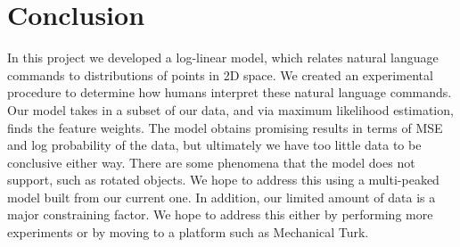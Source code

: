 \documentclass[12pt,letterpaper]{article}
\begin{document}
\section{Conclusion}
In this project we developed a log-linear model, which relates natural language commands to distributions of points in 2D space. We created an experimental procedure to determine how humans interpret these natural language commands. Our model takes in a subset of our data, and via maximum likelihood estimation, finds the feature weights. The model obtains promising results in terms of MSE and log probability of the data, but ultimately we have too little data to be conclusive either way. There are some phenomena that the model does not support, such as rotated objects. We hope to address this using a multi-peaked model built from our current one. In addition, our limited amount of data is a major constraining factor. We hope to address this either by performing more experiments or by moving to a platform such as Mechanical Turk.
\end{document}
